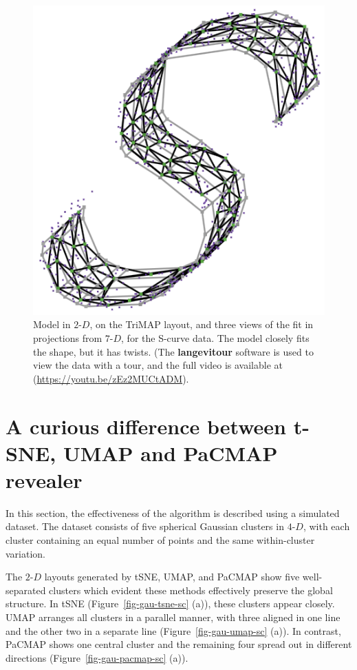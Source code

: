\documentclass[
  12pt]{article}
\newcommand\gD{$2\text{-}D$}
\begin{document}
\begin{figure}[H]
%
\begin{minipage}{0.25\linewidth}
\includegraphics{figures/scurve/sc_trimap_best_3.png}\end{minipage}%

\caption{\label{fig-scurve-sc-best}Model in \gD{}, on the TriMAP layout,
and three views of the fit in projections from \(7\text{-}D\), for the
S-curve data. The model closely fits the shape, but it has twists. (The
\textbf{langevitour} software is used to view the data with a tour, and
the full video is available at (\url{https://youtu.be/zEz2MUCtADM}).}

\end{figure}%

\section{A curious difference between t-SNE, UMAP and PaCMAP
revealer}\label{a-curious-difference-between-t-sne-umap-and-pacmap-revealer}

In this section, the effectiveness of the algorithm is described using a
simulated dataset. The dataset consists of five spherical Gaussian
clusters in \(4\text{-}D\), with each cluster containing an equal number
of points and the same within-cluster variation.

The \gD{} layouts generated by tSNE, UMAP, and PaCMAP show five
well-separated clusters which evident these methods effectively preserve
the global structure. In tSNE (Figure~\ref{fig-gau-tsne-sc} (a)), these
clusters appear closely. UMAP arranges all clusters in a parallel
manner, with three aligned in one line and the other two in a separate
line (Figure~\ref{fig-gau-umap-sc} (a)). In contrast, PaCMAP shows one
central cluster and the remaining four spread out in different
directions (Figure~\ref{fig-gau-pacmap-sc} (a)).
\end{document}
